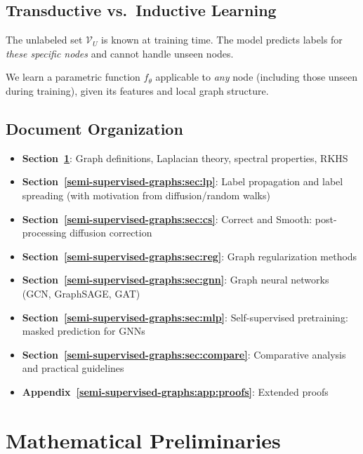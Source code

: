 \begin{notechapter}
\subsection{Transductive vs.\ Inductive Learning}

\begin{definition}
The unlabeled set $\mathcal{V}_U$ is known at training time. The model
predicts labels for \emph{these specific nodes} and cannot handle unseen nodes.
\end{definition}

\begin{definition}
We learn a parametric function $f_\theta$ applicable to \emph{any} node
(including those unseen during training), given its features and local graph
structure.
\end{definition}

\subsection{Document Organization}

\begin{itemize}
    \item \textbf{Section~\ref{semi-supervised-graphs:sec:prelim}}: Graph definitions, Laplacian
      theory, spectral properties, RKHS
    \item \textbf{Section~\ref{semi-supervised-graphs:sec:lp}}: Label propagation and label spreading
      (with motivation from diffusion/random walks)
    \item \textbf{Section~\ref{semi-supervised-graphs:sec:cs}}: Correct and Smooth: post-processing
      diffusion correction
    \item \textbf{Section~\ref{semi-supervised-graphs:sec:reg}}: Graph regularization methods
    \item \textbf{Section~\ref{semi-supervised-graphs:sec:gnn}}: Graph neural networks (GCN,
      GraphSAGE, GAT)
    \item \textbf{Section~\ref{semi-supervised-graphs:sec:mlp}}: Self-supervised pretraining:
      masked prediction for GNNs
    \item \textbf{Section~\ref{semi-supervised-graphs:sec:compare}}: Comparative analysis and
      practical guidelines
    \item \textbf{Appendix~\ref{semi-supervised-graphs:app:proofs}}: Extended proofs
\end{itemize}


\newpage
\section{Mathematical Preliminaries}
\label{semi-supervised-graphs:sec:prelim}


\end{notechapter}
